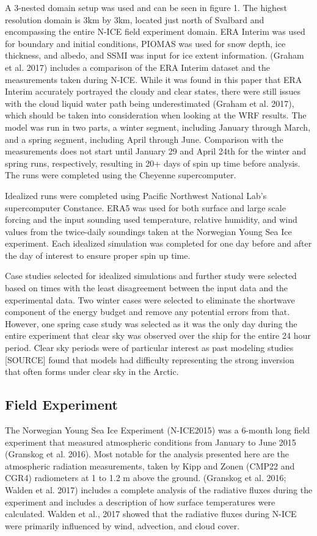 A 3-nested domain setup was used and can be seen in figure 1. The highest resolution domain is 3km by 3km, located just north of Svalbard and encompassing the entire N-ICE field experiment domain. ERA Interim was used for boundary and initial conditions, PIOMAS was used for snow depth, ice thickness, and albedo, and SSMI was input for ice extent information. (Graham et al. 2017) includes a comparison of the ERA Interim dataset and the measurements taken during N-ICE. While it was found in this paper that ERA Interim accurately portrayed the cloudy and clear states, there were still issues with the cloud liquid water path being underestimated (Graham et al. 2017), which should be taken into consideration when looking at the WRF results. The model was run in two parts, a winter segment, including January through March, and a spring segment, including April through June. Comparison with the measurements does not start until January 29 and April 24th for the winter and spring runs, respectively, resulting in 20+ days of spin up time before analysis. The runs were completed using the Cheyenne supercomputer.

Idealized runs were completed using Pacific Northwest National Lab’s supercomputer Constance. ERA5 was used for both surface and large scale forcing and the input sounding used temperature, relative humidity, and wind values from the twice-daily soundings taken at the Norwegian Young Sea Ice experiment. Each idealized simulation was completed for one day before and after the day of interest to ensure proper spin up time. 

Case studies selected for idealized simulations and further study were selected based on times with the least disagreement between the input data and the experimental data. Two winter cases were selected to eliminate the shortwave component of the energy budget and remove any potential errors from that. However, one spring case study was selected as it was the only day during the entire experiment that clear sky was observed over the ship for the entire 24 hour period. Clear sky periods were of particular interest as past modeling studies [SOURCE] found that models had difficulty representing the strong inversion that often forms under clear sky in the Arctic.

\subsection{Field Experiment}
The Norwegian Young Sea Ice Experiment (N-ICE2015) was a 6-month long field experiment that measured atmospheric conditions from January to June 2015 (Granskog et al. 2016). Most notable for the analysis presented here are the atmospheric radiation measurements, taken by Kipp and Zonen (CMP22 and CGR4) radiometers at 1 to 1.2 m above the ground. (Granskog et al. 2016; Walden et al. 2017) includes a complete analysis of the radiative fluxes during the experiment and includes a description of how surface temperatures were calculated. Walden et al., 2017 showed that the radiative fluxes during N-ICE were primarily influenced by wind, advection, and cloud cover.

